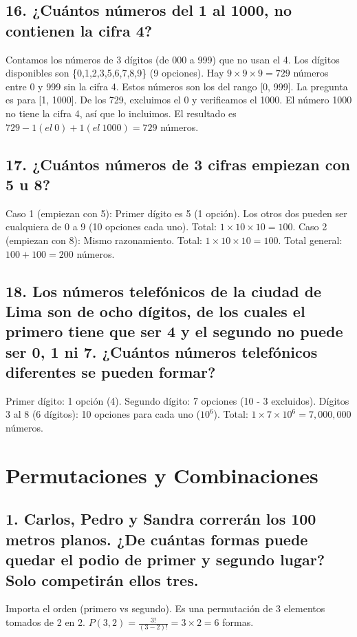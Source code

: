 \documentclass[11pt]{article}
\begin{document}
    \subsection*{16. ¿Cuántos números del 1 al 1000, no contienen la cifra 4?}
    Contamos los números de 3 dígitos (de 000 a 999) que no usan el 4. Los dígitos disponibles son \{0,1,2,3,5,6,7,8,9\} (9 opciones).
    Hay $9 \times 9 \times 9 = 729$ números entre 0 y 999 sin la cifra 4.
    Estos números son los del rango [0, 999]. La pregunta es para [1, 1000]. De los 729, excluimos el 0 y verificamos el 1000. El número 1000 no tiene la cifra 4, así que lo incluimos. El resultado es $729 - 1 (el \: 0) + 1 (el \: 1000) = 729$ números.

    \subsection*{17. ¿Cuántos números de 3 cifras empiezan con 5 u 8?}
    Caso 1 (empiezan con 5): Primer dígito es 5 (1 opción). Los otros dos pueden ser cualquiera de 0 a 9 (10 opciones cada uno). Total: $1 \times 10 \times 10 = 100$.
    Caso 2 (empiezan con 8): Mismo razonamiento. Total: $1 \times 10 \times 10 = 100$.
    Total general: $100 + 100 = 200$ números.

    \subsection*{18. Los números telefónicos de la ciudad de Lima son de ocho dígitos, de los cuales el primero tiene que ser 4 y el segundo no puede ser 0, 1 ni 7. ¿Cuántos números telefónicos diferentes se pueden formar?}
    Primer dígito: 1 opción (4).
    Segundo dígito: 7 opciones (10 - 3 excluidos).
    Dígitos 3 al 8 (6 dígitos): 10 opciones para cada uno ($10^6$).
    Total: $1 \times 7 \times 10^6 = 7,000,000$ números.

    \newpage

\section{Permutaciones y Combinaciones}
    \subsection*{1. Carlos, Pedro y Sandra correrán los 100 metros planos. ¿De cuántas formas puede quedar el podio de primer y segundo lugar? Solo competirán ellos tres.}
    Importa el orden (primero vs segundo). Es una permutación de 3 elementos tomados de 2 en 2. $P(3,2) = \frac{3!}{(3-2)!} = 3 \times 2 = 6$ formas.
\end{document}
